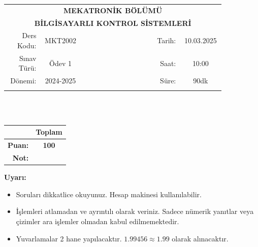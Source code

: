 \newcommand\UniversiteAdi{Niğde Ömer Halisdemir Üniversitesi}
\newcommand\BolumAdi{MEKATRONİK BÖLÜMÜ}
\newcommand\DersKodu{MKT2002}
\newcommand\DersAdi{BİLGİSAYARLI KONTROL SİSTEMLERİ}
\newcommand\SinavAdi{Ödev 1}
\newcommand\SinavTarihi{10.03.2025}
\newcommand\SinavSaati{10:00}
\newcommand\SinavSuresi{90dk}

\pagestyle{fancy}
\fancyhf{} %
\noindent
\begin{tabular}{
    p{0.15\linewidth}
    p{0.15\linewidth}
    p{0.3\linewidth}
    p{0.1\linewidth}
    p{0.15\linewidth}}
    \multicolumn{5}{c}{\textbf{\BolumAdi}}\\
    \multicolumn{5}{c}{\textbf{\DersAdi}}\\\hline
    \multicolumn{1}{|r|}{Ders Kodu:}&
    \multicolumn{1}{|c|}{\DersKodu}&
    \multicolumn{1}{|c|}{}& 
    \multicolumn{1}{|r|}{Tarih:}&
    \multicolumn{1}{|c|}{\SinavTarihi} \\\hline
    \multicolumn{1}{|r|}{Sınav Türü:}&
    \multicolumn{1}{|c|}{\SinavAdi}&  
    \multicolumn{1}{|c|}{}&
    \multicolumn{1}{|r|}{Saat:}&
    \multicolumn{1}{|c|}{\SinavSaati}\\\hline
    \multicolumn{1}{|r|}{Dönemi:}&
    \multicolumn{1}{|c|}{2024-2025}&
    \multicolumn{1}{|c|}{}&
    \multicolumn{1}{|r|}{Süre:}&
    \multicolumn{1}{|c|}{\SinavSuresi} \\\hline
    &&&&\\
\end{tabular}\\\\
\noindent\begin{center}
\begin{tabular}{|r|c|}\hline
    &\textbf{Toplam}\\\hline
    \textbf{Puan:} &\textbf{100}\\\hline
    \textbf{Not:}  &\\\hline
\end{tabular}\end{center}
\noindent\textbf{Uyarı:}
\begin{itemize}\bfseries
    \item Soruları dikkatlice okuyunuz. Hesap makinesi kullanılabilir.
    \item İşlemleri atlamadan ve ayrıntılı olarak veriniz. Sadece nümerik yanıtlar veya çizimler ara işlemler olmadan kabul edilmemektedir.
    \item Yuvarlamalar 2 hane yapılacaktır. $\mathbf{1.99456\approx1.99}$ olarak alınacaktır.
\end{itemize}
